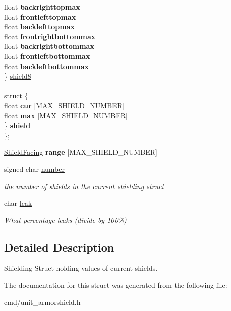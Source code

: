 \begin{DoxyCompactItemize}
\begin{tabbing}
\>\>float {\bfseries backrighttopmax}\\
\>\>float {\bfseries frontlefttopmax}\\
\>\>float {\bfseries backlefttopmax}\\
\>\>float {\bfseries frontrightbottommax}\\
\>\>float {\bfseries backrightbottommax}\\
\>\>float {\bfseries frontleftbottommax}\\
\>\>float {\bfseries backleftbottommax}\\
\>\} \hyperlink{structShield_ade18336231e55e0a0cd6b85f29cc8271}{shield8}\\
\>\>\\
\>struct \{\\
\>\>float {\bfseries cur} \mbox{[}MAX\_SHIELD\_NUMBER\mbox{]}\\
\>\>float {\bfseries max} \mbox{[}MAX\_SHIELD\_NUMBER\mbox{]}\\
\>\} {\bfseries shield}\\
\}; \hypertarget{structShield_ade95d213b77231a3d9b47076e4158107}{}\label{structShield_ade95d213b77231a3d9b47076e4158107}
\\

\end{tabbing}\item 
\hyperlink{structShieldFacing}{Shield\+Facing} {\bfseries range} \mbox{[}M\+A\+X\+\_\+\+S\+H\+I\+E\+L\+D\+\_\+\+N\+U\+M\+B\+ER\mbox{]}\hypertarget{structShield_ab5ed3311a6ddcb821bb44588be3a3195}{}\label{structShield_ab5ed3311a6ddcb821bb44588be3a3195}

\item 
signed char \hyperlink{structShield_a244d5c67eafb55a8409d436d51b26760}{number}\hypertarget{structShield_a244d5c67eafb55a8409d436d51b26760}{}\label{structShield_a244d5c67eafb55a8409d436d51b26760}

\begin{DoxyCompactList}\small\item\em the number of shields in the current shielding struct \end{DoxyCompactList}\item 
char \hyperlink{structShield_af8e0daf8b4a71852253e4b0c8c6c042e}{leak}\hypertarget{structShield_af8e0daf8b4a71852253e4b0c8c6c042e}{}\label{structShield_af8e0daf8b4a71852253e4b0c8c6c042e}

\begin{DoxyCompactList}\small\item\em What percentage leaks (divide by 100\%) \end{DoxyCompactList}\end{DoxyCompactItemize}


\subsection{Detailed Description}
Shielding Struct holding values of current shields. 

The documentation for this struct was generated from the following file\+:\begin{DoxyCompactItemize}
\item 
cmd/unit\+\_\+armorshield.\+h\end{DoxyCompactItemize}
